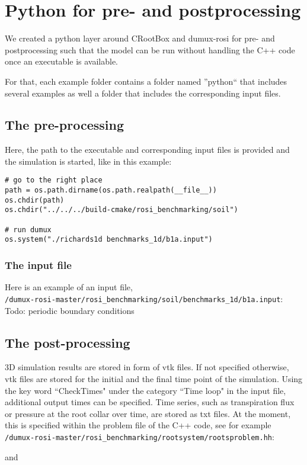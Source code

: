 \chapter*{Python for pre- and postprocessing}
We created a python layer around CRootBox and dumux-rosi for pre- and postprocessing such that the model can be run without handling the C++ code once an executable is available. 

For that, each example folder contains a folder named ''python`` that includes several examples as well a folder that includes the corresponding input files. 

\section*{The pre-processing}
Here, the path to the executable and corresponding input files is provided and the simulation is started, like in this example: 
\begin{lstlisting}
# go to the right place
path = os.path.dirname(os.path.realpath(__file__))
os.chdir(path)
os.chdir("../../../build-cmake/rosi_benchmarking/soil")

# run dumux
os.system("./richards1d benchmarks_1d/b1a.input")
\end{lstlisting}

\subsection*{The input file}
Here is an example of an input file,\\
\verb+/dumux-rosi-master/rosi_benchmarking/soil/benchmarks_1d/b1a.input+:
	\\

Todo: periodic boundary conditions

\section*{The post-processing}
3D simulation results are stored in form of vtk files. If not specified otherwise, vtk files are stored for the initial and the final time point of the simulation. Using the key word ``CheckTimes" under the category ``Time loop" in the input file, additional output times can be specified. Time series, such as transpiration flux or pressure at the root collar over time, are stored as txt files. At the moment, this is specified within the problem file of the C++ code, see for example\\
\verb+/dumux-rosi-master/rosi_benchmarking/rootsystem/rootsproblem.hh+:
	 
and
	  

